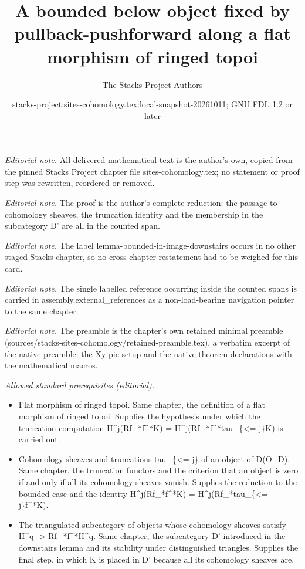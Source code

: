\documentclass[10pt,a4paper]{amsart}
\title{A bounded below object fixed by pullback-pushforward along a flat morphism of ringed topoi}
\author{The Stacks Project Authors}
\date{stacks-project:sites-cohomology.tex:local-snapshot-20261011; GNU FDL 1.2 or later}
\theoremstyle{plain}
\theoremstyle{definition}
\theoremstyle{remark}
\numberwithin{equation}{subsection}
\begin{document}
\maketitle
\noindent\textit{Editorial note.} All delivered mathematical text is the author's own, copied from the pinned Stacks Project chapter file sites-cohomology.tex; no statement or proof step was rewritten, reordered or removed.\par\medskip
\noindent\textit{Editorial note.} The proof is the author's complete reduction: the passage to cohomology sheaves, the truncation identity and the membership in the subcategory D' are all in the counted span.\par\medskip
\noindent\textit{Editorial note.} The label lemma-bounded-in-image-downstairs occurs in no other staged Stacks chapter, so no cross-chapter restatement had to be weighed for this card.\par\medskip
\noindent\textit{Editorial note.} The single labelled reference occurring inside the counted spans is carried in assembly.external\_references as a non-load-bearing navigation pointer to the same chapter.\par\medskip
\noindent\textit{Editorial note.} The preamble is the chapter's own retained minimal preamble (sources/stacks-sites-cohomology/retained-preamble.tex), a verbatim excerpt of the native preamble: the Xy-pic setup and the native theorem declarations with the mathematical macros.\par\medskip
\noindent\textit{Allowed standard prerequisites (editorial).}\begin{itemize}
\item Flat morphism of ringed topoi. Same chapter, the definition of a flat morphism of ringed topoi. Supplies the hypothesis under which the truncation computation H\textasciicircum{}j(Rf\_*f\textasciicircum{}*K) = H\textasciicircum{}j(Rf\_*f\textasciicircum{}*tau\_\{<= j\}K) is carried out.
\item Cohomology sheaves and truncations tau\_\{<= j\} of an object of D(O\_D). Same chapter, the truncation functors and the criterion that an object is zero if and only if all its cohomology sheaves vanish. Supplies the reduction to the bounded case and the identity H\textasciicircum{}j(Rf\_*f\textasciicircum{}*K) = H\textasciicircum{}j(Rf\_*tau\_\{<= j\}f\textasciicircum{}*K).
\item The triangulated subcategory of objects whose cohomology sheaves satisfy H\textasciicircum{}q -> Rf\_*f\textasciicircum{}*H\textasciicircum{}q. Same chapter, the subcategory D' introduced in the downstairs lemma and its stability under distinguished triangles. Supplies the final step, in which K is placed in D' because all its cohomology sheaves are.
\end{itemize}\medskip
\end{document}
